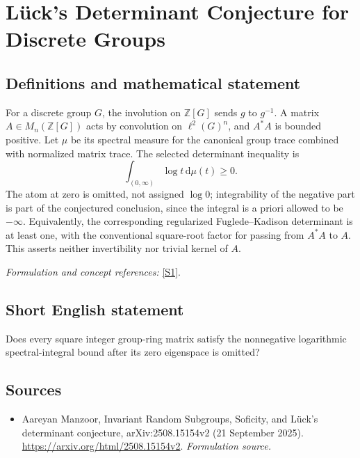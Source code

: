 \documentclass[11pt]{article}
\begin{document}
\section*{\texorpdfstring{Lück's Determinant Conjecture for Discrete Groups}{Lück's Determinant Conjecture for Discrete Groups}}\label{30006924}
\subsection{Definitions and mathematical statement}
For a discrete group $G$, the involution on ${\mathbb{Z}}[G]$ sends $g$ to $g^{-1}$. A matrix $A\in M_n({\mathbb{Z}}[G])$ acts by convolution on $\ell^2(G)^n$, and $A^*A$ is bounded positive. Let $\mu$ be its spectral measure for the canonical group trace combined with normalized matrix trace. The selected determinant inequality is
\[
 \int_{(0,\infty)}\log t{\,\mathrm{d}}\mu(t)\ge0.
\]
The atom at zero is omitted, not assigned $\log0$; integrability of the negative part is part of the conjectured conclusion, since the integral is a priori allowed to be $-\infty$. Equivalently, the corresponding regularized Fuglede--Kadison determinant is at least one, with the conventional square-root factor for passing from $A^*A$ to $A$. This asserts neither invertibility nor trivial kernel of $A$.
\par\smallskip\textit{Formulation and concept references:} \href{https://arxiv.org/html/2508.15154v2}{[S1]}.

\subsection{Short English statement}
Does every square integer group-ring matrix satisfy the nonnegative logarithmic spectral-integral bound after its zero eigenspace is omitted?
\subsection{Sources}
\begin{itemize}
\item[S1]Aareyan Manzoor, Invariant Random Subgroups, Soficity, and Lück's determinant conjecture, arXiv:2508.15154v2 (21 September 2025).
\url{https://arxiv.org/html/2508.15154v2}.
\textit{Formulation source.}
\end{itemize}
\end{document}
